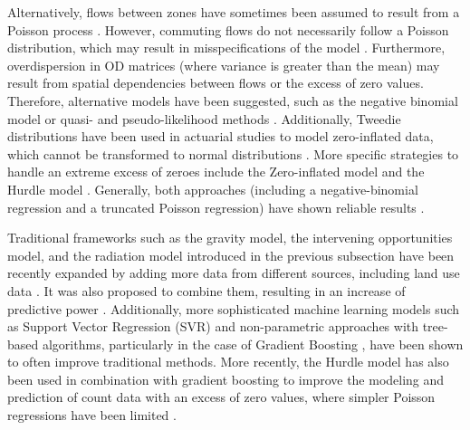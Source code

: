 Alternatively, flows between zones have sometimes been assumed to result from a Poisson process \citep{Cameron2013RegressionData}.
However, commuting flows do not necessarily follow a Poisson distribution, which may result in misspecifications of the model \citep{Farmer2011CommutingTravel-to-work}. Furthermore, overdispersion in OD matrices (where variance is greater than the mean) may result from spatial dependencies between flows or the excess of zero values. Therefore, alternative models have been suggested, such as the negative binomial model \citep{Cameron2005Microeconometrics, Hilbe2011NegativeRegression} or quasi- and pseudo-likelihood methods \citep{Farmer2011CommutingTravel-to-work, Jeong2023EstimationApproach}. 
Additionally, Tweedie distributions \citep{Tweedie1984AnFamilies} have been used in actuarial studies to model zero-inflated data, which cannot be transformed to normal distributions \citep{Zhou2020TweedieData}.
More specific strategies to handle an extreme excess of zeroes include the Zero-inflated model \citep{Lambert1992Zero-InflatedManufacturing} and the Hurdle model \citep{Cragg1971SomeGoods, Mullahy1986SpecificationModels}. 
Generally, both approaches (including a negative-binomial regression and a truncated Poisson regression) have shown reliable results \citep{Farmer2011CommutingTravel-to-work}.

Traditional frameworks such as the gravity model, the intervening opportunities model, and the radiation model introduced in the previous subsection have been recently expanded by adding more data from different sources, including land use data \citep{Liu2020HowPerspective}. It was also proposed to combine them, resulting in an increase of predictive power \citep{Rong2023AnTechniques}. Additionally, more sophisticated machine learning models such as Support Vector Regression (SVR) \citep{Rodriguez-Rueda2021OriginDestinationModel} and non-parametric approaches with tree-based algorithms, particularly in the case of Gradient Boosting \citep{Pourebrahim2019TripData, Robinson2018AMigration, Schimohr2023PredictionAlgorithm, Rowe2022AssessingWeather, Ramesh2021Station-levelSystem, Cheng2021Flow-basedCarsharing}, have been shown to often improve traditional methods. 
More recently, the Hurdle model \citep{Cragg1971SomeGoods, Mullahy1986SpecificationModels} has also been used in combination with gradient boosting to improve the modeling and prediction of count data with an excess of zero values, where simpler Poisson regressions have been limited \citep{Krasniqi2022ParametricFrequency, Xu2024GeneralizedDemand}.

